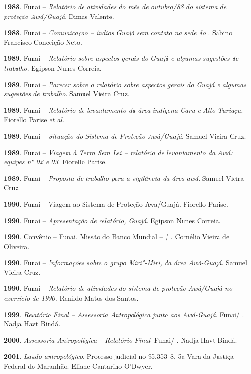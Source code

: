 \begin{Parskip}
\textbf{1988}. Funai -- \emph{Relatório} \emph{de atividades do mês de
outubro/88 do sistema de proteção Awá/Guajá}. Dimas Valente.

\textbf{1988}. Funai -- \emph{Comunicação -- índios Guajá sem contato na
sede do }. Sabino Francisco Conceição Neto.

\textbf{1989}. Funai -- \emph{Relatório sobre aspectos gerais do 
Guajá e algumas sugestões de trabalho}. Egipson Nunes Correia.

\textbf{1989}. Funai -- \emph{Parecer sobre o relatório sobre aspectos
gerais do  Guajá e algumas sugestões de trabalho}. Samuel Vieira
Cruz.

\textbf{1989}. Funai -- \emph{Relatório de levantamento da área indígena
Caru e Alto Turiaçu.} Fiorello Parise \emph{et al}.

\textbf{1989}. Funai -- \emph{Situação do Sistema de Proteção
Awá/Guajá}. Samuel Vieira Cruz.

\textbf{1989}. Funai -- \emph{Viagem à Terra Sem Lei -- relatório de
levantamento da  Awá: equipes nº 02 e 03}. Fiorello Parise.

\textbf{1989}. Funai -- \emph{Proposta de trabalho para a vigilância da
área awá}. Samuel Vieira Cruz.

\textbf{1990}. Funai -- Viagem ao Sistema de Proteção Awa/Guajá.
Fiorello Parise.

\textbf{1990}. Funai -- \emph{Apresentação de relatório,  Guajá}.
Egipson Nunes Correia.

\textbf{1990}. Convênio  -- Funai. Missão do Banco Mundial -- /
. Cornélio Vieira de Oliveira.

\textbf{1990}. Funai -- \emph{Informações sobre o grupo Miri"-Miri, da
área Awá-Guajá}. Samuel Vieira Cruz.

\textbf{1990}. Funai -- \emph{Relatório de atividades do sistema de
proteção Awá/Guajá no exercício de 1990.} Renildo Matos dos Santos.

\textbf{1999}. \emph{Relatório Final -- Assessoria Antropológica junto aos
Awá-Guajá}. Funai/ . Nadja Havt Bindá.

\textbf{2000}. \emph{Assessoria Antropológica -- Relatório Final}. Funai/
. Nadja Havt Bindá.

\textbf{2001}. \emph{Laudo antropológico}. Processo judicial no
95.353--8. 5a Vara da Justiça Federal do Maranhão. Eliane Cantarino
O'Dwyer.


\end{Parskip}
